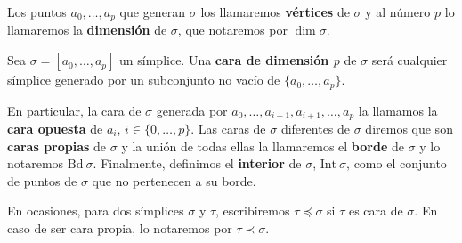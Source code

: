 Los puntos $a_{0}, \dots, a_{p}$ que generan $\sigma$ los llamaremos \textbf{vértices}
de $\sigma$ y al número $p$ lo llamaremos la \textbf{dimensión} de $\sigma$, que
notaremos por $\dim \sigma$.

\begin{definicion}
	Sea $\sigma=[a_{0}, \dots, a_{p}]$ un símplice. Una \textbf{cara de dimensión
		$p$} de $\sigma$ será cualquier símplice generado por un subconjunto no vacío de
	$\{a_{0}, \dots, a_{p}\}$.
\end{definicion}
En particular, la cara de $\sigma$ generada por
$a_{0}, \dots, a_{i-1}, a_{i+1}, \dots, a_{p}$ la llamamos la \textbf{cara
	opuesta} de $a_{i}$, $i \in \{0, \dots, p\}$. Las caras de $\sigma$ diferentes de
$\sigma$ diremos que son \textbf{caras propias} de $\sigma$ y la unión de todas
ellas la llamaremos el \textbf{borde} de $\sigma$ y lo notaremos $\text{Bd}\ \sigma$.
Finalmente, definimos el \textbf{interior} de $\sigma$, $\text{Int}\ \sigma$,
como el conjunto de puntos de $\sigma$ que no pertenecen a su borde.

En ocasiones, para dos símplices $\sigma$ y $\tau$, escribiremos $\tau \preceq \sigma$ si $\tau$ es cara de $\sigma$. En caso de ser cara propia, lo notaremos por $\tau \prec \sigma$.

